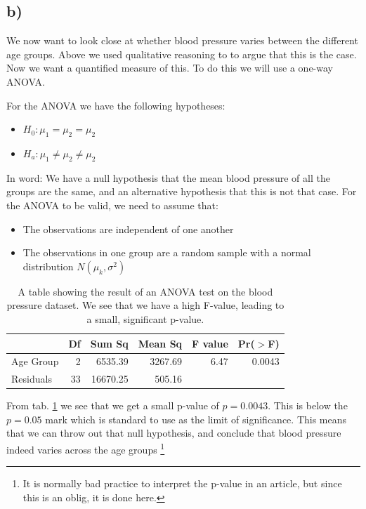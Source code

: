 \documentclass[a4paper,norsk, 10pt]{article}
\begin{document}
\subsection*{b)}

We now want to look close at whether blood pressure varies between the different age groups. Above we used qualitative reasoning to to argue that this is the case. Now we want a quantified measure of this. To do this we will use a one-way ANOVA. 

For the ANOVA we have the following hypotheses:
\begin{itemize}
  \item $H_0: \mu_1 = \mu_2 = \mu_2$
  \item $H_a:  \mu_1 \neq \mu_2 \neq \mu_2$
\end{itemize}

In word: We have a null hypothesis that the mean blood pressure of all the groups are the same, and an alternative hypothesis that this is not that case. For the ANOVA to be valid, we need to assume that: 

\begin{itemize}
  \item The observations are independent of one another
  \item The observations in one group are a random sample with a normal distribution $N(\mu_k,\sigma^2)$
\end{itemize} 



\begin{table}[!htbp]
\centering
\begin{tabular}{lrrrrr}
  \hline
 & Df & Sum Sq & Mean Sq & F value & Pr($>$F) \\ 
  \hline
Age Group & 2 & 6535.39 & 3267.69 & 6.47 & 0.0043 \\ 
  Residuals & 33 & 16670.25 & 505.16 &  &  \\ 
   \hline
\end{tabular}
\caption{A table showing the result of an ANOVA test on the blood pressure dataset. We see that we have a high F-value, leading to a small, significant p-value.}\label{tab:blood_anova}

\end{table}


From tab. \ref{tab:blood_anova} we see that we get a small p-value of $p=0.0043$. This is below the $p=0.05$ mark which is standard to use as the limit of significance. This means that we can throw out that null hypothesis, and conclude that blood pressure indeed varies across the age groups \footnote{It is normally bad practice to interpret the p-value in an article, but since this is an oblig, it is done here.}
\end{document}
